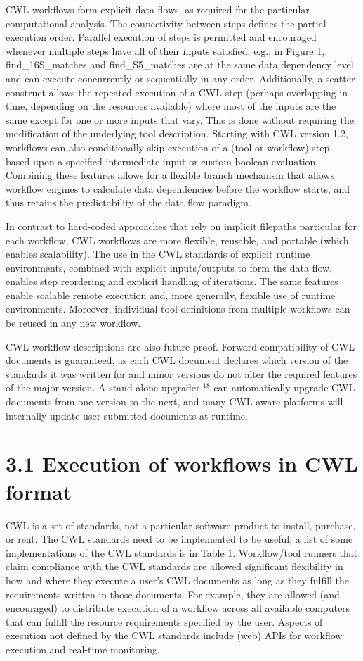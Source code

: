 \documentclass[
]{article}
\begin{document}
CWL workflows form explicit data flows, as required for the particular
computational analysis. The connectivity between steps defines the
partial execution order. Parallel execution of steps is permitted and
encouraged whenever multiple steps have all of their inputs satisfied,
e.g., in Figure 1, find\_16S\_matches and find\_S5\_matches are at the
same data dependency level and can execute concurrently or sequentially
in any order. Additionally, a scatter construct allows the repeated
execution of a CWL step (perhaps overlapping in time, depending on the
resources available) where most of the inputs are the same except for
one or more inputs that vary. This is done without requiring the
modification of the underlying tool description. Starting with CWL
version 1.2, workflows can also conditionally skip execution of a (tool
or workflow) step, based upon a specified intermediate input or custom
boolean evaluation. Combining these features allows for a flexible
branch mechanism that allows workflow engines to calculate data
dependencies before the workflow starts, and thus retains the
predictability of the data flow paradigm.

In contrast to hard-coded approaches that rely on implicit filepaths
particular for each workflow, CWL workflows are more flexible, reusable,
and portable (which enables scalability). The use in the CWL standards
of explicit runtime environments, combined with explicit inputs/outputs
to form the data flow, enables step reordering and explicit handling of
iterations. The same features enable scalable remote execution and, more
generally, flexible use of runtime environments. Moreover, individual
tool definitions from multiple workflows can be reused in any new
workflow.

CWL workflow descriptions are also future-proof. Forward compatibility
of CWL documents is guaranteed, as each CWL document declares which
version of the standards it was written for and minor versions do not
alter the required features of the major version. A stand-alone upgrader
\(^{18}\) can automatically upgrade CWL documents from one version to
the next, and many CWL-aware platforms will internally update
user-submitted documents at runtime.

\section{3.1 Execution of workflows in CWL
format}\label{execution-of-workflows-in-cwl-format}

CWL is a set of standards, not a particular software product to install,
purchase, or rent. The CWL standards need to be implemented to be
useful; a list of some implementations of the CWL standards is in Table
1. Workflow/tool runners that claim compliance with the CWL standards
are allowed significant flexibility in how and where they execute a
user's CWL documents as long as they fulfill the requirements written in
those documents. For example, they are allowed (and encouraged) to
distribute execution of a workflow across all available computers that
can fulfill the resource requirements specified by the user. Aspects of
execution not defined by the CWL standards include (web) APIs for
workflow execution and real-time monitoring.
\end{document}
